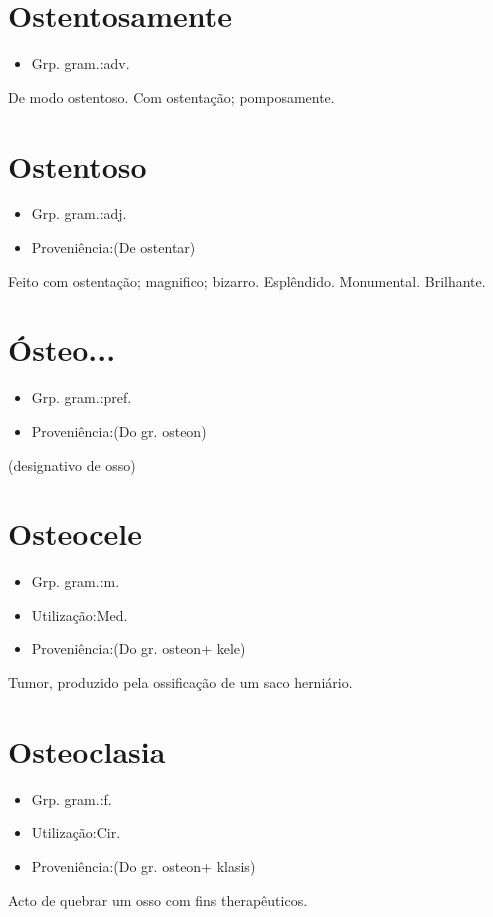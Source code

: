\section{Ostentosamente}
\begin{itemize}
\item {Grp. gram.:adv.}
\end{itemize}
De modo ostentoso.
Com ostentação; pomposamente.
\section{Ostentoso}
\begin{itemize}
\item {Grp. gram.:adj.}
\end{itemize}
\begin{itemize}
\item {Proveniência:(De \textunderscore ostentar\textunderscore )}
\end{itemize}
Feito com ostentação; magnifico; bizarro.
Esplêndido.
Monumental.
Brilhante.
\section{Ósteo...}
\begin{itemize}
\item {Grp. gram.:pref.}
\end{itemize}
\begin{itemize}
\item {Proveniência:(Do gr. \textunderscore osteon\textunderscore )}
\end{itemize}
(designativo de \textunderscore osso\textunderscore )
\section{Osteocele}
\begin{itemize}
\item {Grp. gram.:m.}
\end{itemize}
\begin{itemize}
\item {Utilização:Med.}
\end{itemize}
\begin{itemize}
\item {Proveniência:(Do gr. \textunderscore osteon\textunderscore  + \textunderscore kele\textunderscore )}
\end{itemize}
Tumor, produzido pela ossificação de um saco herniário.
\section{Osteoclasia}
\begin{itemize}
\item {Grp. gram.:f.}
\end{itemize}
\begin{itemize}
\item {Utilização:Cir.}
\end{itemize}
\begin{itemize}
\item {Proveniência:(Do gr. \textunderscore osteon\textunderscore  + \textunderscore klasis\textunderscore )}
\end{itemize}
Acto de quebrar um osso com fins therapêuticos.
